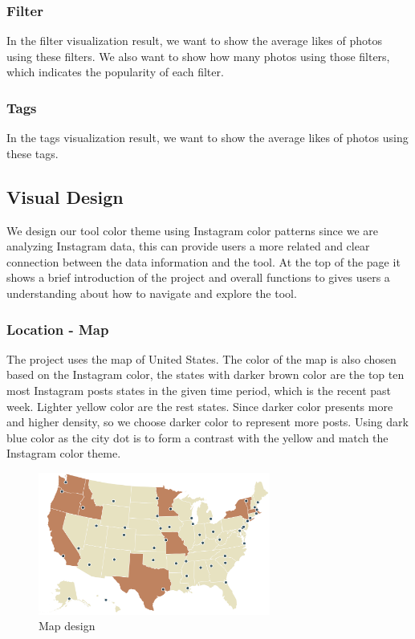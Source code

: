 \documentclass[conference]{acmsiggraph}
\begin{document}
\subsubsection{Filter}
In the filter visualization result, we want to show the average likes of photos using these filters. We also want to show how many photos using those filters, which indicates the popularity of each filter.

\subsubsection{Tags}
In the tags visualization result, we want to show the average likes of photos using these tags.

\subsection{Visual Design}

We design our tool color theme using Instagram color patterns since we are analyzing Instagram data, this can provide users a more related and clear connection between the data information and the tool. At the top of the page it shows a brief introduction of the project and overall functions to gives users a understanding about how to navigate and explore the tool.

\subsubsection{Location - Map}
The project uses the map of United States. The color of the map is also chosen based on the Instagram color, the states with darker brown color are the top ten most Instagram posts states in the given time period, which is the recent past week. Lighter yellow color are the rest states. Since darker color presents more and higher density, so we choose darker color to represent more posts. Using dark blue color as the city dot is to form a contrast with the yellow and match the Instagram color theme.
\begin{figure}[ht]
  \centering
\includegraphics[width=3in]{images/map}
  \caption{Map design}
  \label{like-filter}
\end{figure}
\end{document}
